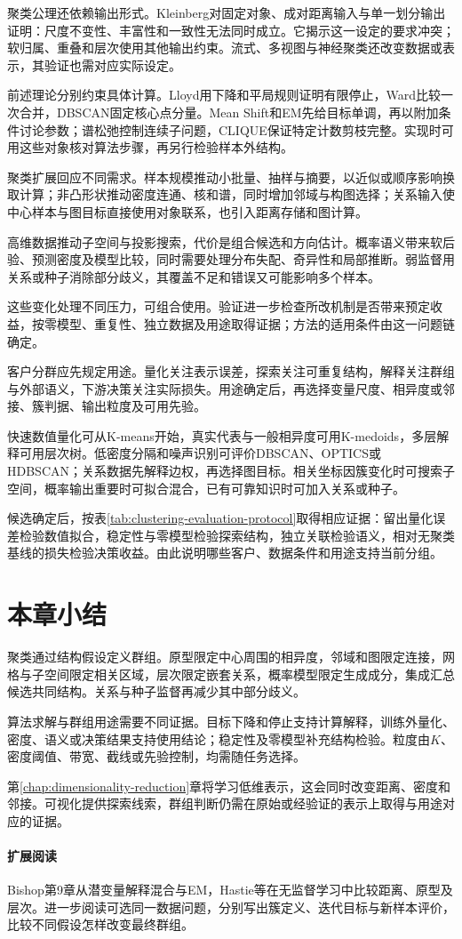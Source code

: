 聚类公理还依赖输出形式。Kleinberg对固定对象、成对距离输入与单一划分输出证明：尺度不变性、丰富性和一致性无法同时成立。它揭示这一设定的要求冲突；软归属、重叠和层次使用其他输出约束。流式、多视图与神经聚类还改变数据或表示，其验证也需对应实际设定。

前述理论分别约束具体计算。Lloyd用下降和平局规则证明有限停止，Ward比较一次合并，DBSCAN固定核心点分量。Mean Shift和EM先给目标单调，再以附加条件讨论参数；谱松弛控制连续子问题，CLIQUE保证特定计数剪枝完整。实现时可用这些对象核对算法步骤，再另行检验样本外结构。

聚类扩展回应不同需求。样本规模推动小批量、抽样与摘要，以近似或顺序影响换取计算；非凸形状推动密度连通、核和谱，同时增加邻域与构图选择；关系输入使中心样本与图目标直接使用对象联系，也引入距离存储和图计算。

高维数据推动子空间与投影搜索，代价是组合候选和方向估计。概率语义带来软后验、预测密度及模型比较，同时需要处理分布失配、奇异性和局部推断。弱监督用关系或种子消除部分歧义，其覆盖不足和错误又可能影响多个样本。

这些变化处理不同压力，可组合使用。验证进一步检查所改机制是否带来预定收益，按零模型、重复性、独立数据及用途取得证据；方法的适用条件由这一问题链确定。

客户分群应先规定用途。量化关注表示误差，探索关注可重复结构，解释关注群组与外部语义，下游决策关注实际损失。用途确定后，再选择变量尺度、相异度或邻接、簇判据、输出粒度及可用先验。

快速数值量化可从K-means开始，真实代表与一般相异度可用K-medoids，多层解释可用层次树。低密度分隔和噪声识别可评价DBSCAN、OPTICS或HDBSCAN；关系数据先解释边权，再选择图目标。相关坐标因簇变化时可搜索子空间，概率输出重要时可拟合混合，已有可靠知识时可加入关系或种子。

候选确定后，按表\ref{tab:clustering-evaluation-protocol}取得相应证据：留出量化误差检验数值拟合，稳定性与零模型检验探索结构，独立关联检验语义，相对无聚类基线的损失检验决策收益。由此说明哪些客户、数据条件和用途支持当前分组。

\section{本章小结}
\label{sec:clustering-summary}

聚类通过结构假设定义群组。原型限定中心周围的相异度，邻域和图限定连接，网格与子空间限定相关区域，层次限定嵌套关系，概率模型限定生成成分，集成汇总候选共同结构。关系与种子监督再减少其中部分歧义。

算法求解与群组用途需要不同证据。目标下降和停止支持计算解释，训练外量化、密度、语义或决策结果支持使用结论；稳定性及零模型补充结构检验。粒度由$K$、密度阈值、带宽、截线或先验控制，均需随任务选择。

第\ref{chap:dimensionality-reduction}章将学习低维表示，这会同时改变距离、密度和邻接。可视化提供探索线索，群组判断仍需在原始或经验证的表示上取得与用途对应的证据。

\paragraph{扩展阅读}
Bishop第9章从潜变量解释混合与EM，Hastie等在无监督学习中比较距离、原型及层次。进一步阅读可选同一数据问题，分别写出簇定义、迭代目标与新样本评价，比较不同假设怎样改变最终群组。